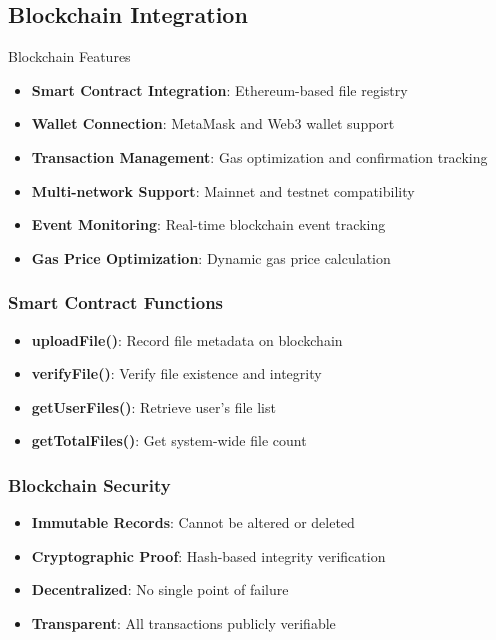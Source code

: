 \documentclass[11pt,a4paper]{article}
\begin{document}
\subsection{Blockchain Integration}

\begin{securitybox}{\faLink\space Blockchain Features}
\begin{itemize}
    \item \textbf{Smart Contract Integration}: Ethereum-based file registry
    \item \textbf{Wallet Connection}: MetaMask and Web3 wallet support
    \item \textbf{Transaction Management}: Gas optimization and confirmation tracking
    \item \textbf{Multi-network Support}: Mainnet and testnet compatibility
    \item \textbf{Event Monitoring}: Real-time blockchain event tracking
    \item \textbf{Gas Price Optimization}: Dynamic gas price calculation
\end{itemize}
\end{securitybox}

\subsubsection{Smart Contract Functions}
\begin{itemize}
    \item \textbf{uploadFile()}: Record file metadata on blockchain
    \item \textbf{verifyFile()}: Verify file existence and integrity
    \item \textbf{getUserFiles()}: Retrieve user's file list
    \item \textbf{getTotalFiles()}: Get system-wide file count
\end{itemize}

\subsubsection{Blockchain Security}
\begin{itemize}
    \item \textbf{Immutable Records}: Cannot be altered or deleted
    \item \textbf{Cryptographic Proof}: Hash-based integrity verification
    \item \textbf{Decentralized}: No single point of failure
    \item \textbf{Transparent}: All transactions publicly verifiable
\end{itemize}
\end{document}
